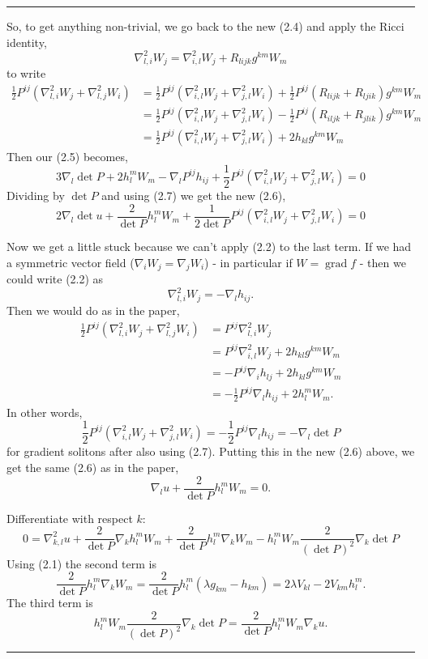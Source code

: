 \documentclass{amsart}
\theoremstyle{definition}
\theoremstyle{remark}
\numberwithin{equation}{section}
\newenvironment{note}{\hrule}{\hrule}
\begin{document}
\begin{note}
So, to get anything non-trivial, we go back to the new (2.4) and apply the Ricci identity,
\[
\nabla^2_{l,i} W_j = \nabla^2_{i,l} W_j + R_{lijk} g^{km} W_m
\]
to write
\begin{align*}
\frac{1}{2} P^{ij} \left(\nabla^2_{l,i} W_j + \nabla^2_{l,j} W_i\right) &= \frac{1}{2} P^{ij} \left(\nabla^2_{i,l} W_j + \nabla^2_{j,l} W_i\right) + \frac{1}{2} P^{ij} \left(R_{lijk} + R_{ljik}\right) g^{km}W_m \\
&= \frac{1}{2} P^{ij} \left(\nabla^2_{i,l} W_j + \nabla^2_{j,l} W_i\right) - \frac{1}{2} P^{ij} \left(R_{iljk} + R_{jlik}\right) g^{km}W_m \\
&= \frac{1}{2} P^{ij} \left(\nabla^2_{i,l} W_j + \nabla^2_{j,l} W_i\right) + 2 h_{kl} g^{km} W_m
\end{align*}
Then our (2.5) becomes,
\[
3 \nabla_l \det P + 2 h_l^m W_m - \nabla_l P^{ij}h_{ij} + \frac{1}{2} P^{ij} \left(\nabla^2_{i,l} W_j + \nabla^2_{j,l} W_i\right) = 0
\]
Dividing by \(\det P\) and using (2.7) we get the new (2.6),
\[
2 \nabla_l \det u + \frac{2}{\det P} h_l^m W_m + \frac{1}{2\det P} P^{ij} \left(\nabla^2_{i,l} W_j + \nabla^2_{j,l} W_i\right) = 0
\]

Now we get a little stuck because we can't apply (2.2) to the last term. If we had a symmetric vector field (\(\nabla_i W_j = \nabla_j W_i\)) - in particular if \(W = \operatorname{grad} f\) - then we could write (2.2) as
\[
\nabla^2_{l,i} W_j = -\nabla_l h_{ij}.
\]
Then we would do as in the paper,
\begin{align*}
\frac{1}{2} P^{ij} \left(\nabla^2_{l,i} W_j + \nabla^2_{l,j} W_i\right) &= P^{ij} \nabla^2_{l,i} W_j \\
&= P^{ij} \nabla^2_{i,l} W_j + 2 h_{kl} g^{km} W_m \\
&= -P^{ij} \nabla_i h_{lj} + 2 h_{kl} g^{km} W_m \\
&= -\frac{1}{2} P^{ij} \nabla_l h_{ij} + 2 h_l^m W_m.
\end{align*}
In other words,
\[
\frac{1}{2} P^{ij} \left(\nabla^2_{i,l} W_j + \nabla^2_{j,l} W_i\right)  = - \frac{1}{2} P^{ij} \nabla_l h_{ij} = - \nabla_l \det P
\]
for gradient solitons after also using (2.7). Putting this in the new (2.6) above, we get the same (2.6) as in the paper,
\[
\nabla_l u + \frac{2}{\det P} h_l^m W_m = 0.
\]

Differentiate with respect \(k\):
\[
0 = \nabla^2_{k,l} u + \frac{2}{\det P} \nabla_k h_l^m W_m + \frac{2}{\det P} h_l^m \nabla_k W_m - h_l^m W_m \frac{2}{(\det P)^2} \nabla_k \det P
\]
Using (2.1) the second term is
\[
\frac{2}{\det P} h_l^m \nabla_k W_m =  \frac{2}{\det P} h_l^m \left(\lambda g_{km} - h_{km}\right) = 2 \lambda V_{kl} - 2 V_{km} h_l^m.
\]
The third term is
\[
h_l^m W_m \frac{2}{(\det P)^2} \nabla_k \det P = \frac{2}{\det P} h_l^m W_m \nabla_k u.
\]


\end{note}
\end{document}
